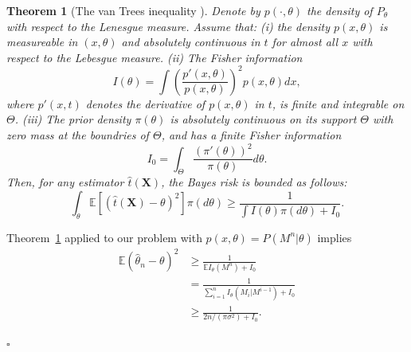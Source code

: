 \documentclass[letterpaper, conference,9pt]{IEEEtran}      %
\newtheorem{thm}{\bf{Theorem}}
\newcommand*{\QEDA}{\hfill\ensuremath{\square}}
\begin{document}
\begin{thm}[The van Trees inequality \cite{tsybakov2008introduction}] \label{thm:vanTrees}  Denote by $p(\cdot,\theta)$ the density of $P_\theta$ with respect to the Lenesgue measure. Assume that: (i) the density $p(x,\theta)$ is measureable in $(x,\theta)$ and absolutely continuous in $t$ for almost all $x$ with respect to the Lebesgue measure. (ii) The Fisher information
\[
I(\theta) = \int \left( \frac{p'(x,\theta)}{p(x,\theta)} \right)^2 p(x,\theta) dx,
\]
where $p'(x,t)$ denotes the derivative of $p(x,\theta)$ in $t$, is finite and integrable on $\Theta$. (iii) The prior density $\pi(\theta)$ is absolutely continuous on its support $\Theta$ with zero mass at the boundries of $\Theta$, and has a finite Fisher information
\[
I_0 = \int_{\Theta} \frac{\left( \pi'(\theta) \right)^2} {\pi(\theta)} d\theta.
\]
Then, for any estimator $\widehat{t}(\mathbf X)$, the Bayes risk is bounded as follows:
\[
\int_{\theta} \mathbb E \left[ \left( \widehat{t}(\mathbf X) - \theta\right)^2 \right] \pi(d\theta) \geq \frac{1}{ \int I(\theta) \pi(d \theta) + I_0 }.
\]
\end{thm}
Theorem~\ref{thm:vanTrees} applied to our problem with $p(x,\theta) = P(M^n|\theta)$ implies
\begin{align*}
\mathbb E \left(\widehat{\theta}_n - \theta \right)^2 &  \geq \frac{1}{ \mathbb E I_\theta(M^n) + I_0} \\
& = \frac{1}{ \sum_{i=1}^n I_\theta (M_i | M^{i-1} ) + I_0} \\
& \geq \frac{1}{ 2n/(\pi \sigma^2) + I_0}.
\end{align*}

\QEDA
\end{document}
